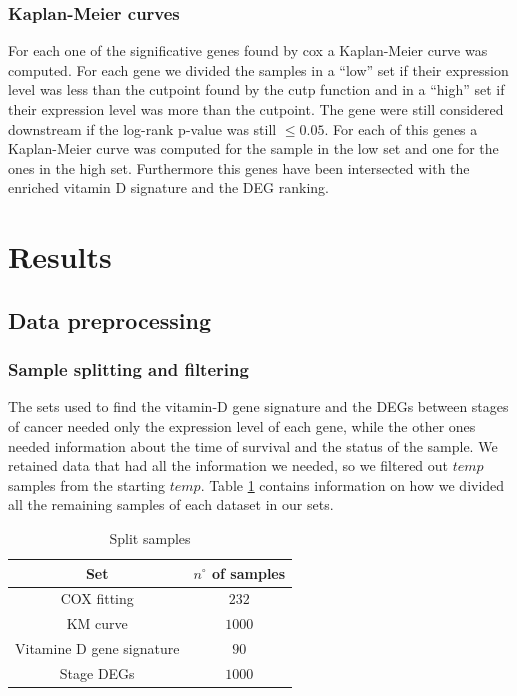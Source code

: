 \documentclass[fleqn,10pt]{SelfArx} %
\begin{document}
		\subsubsection{Kaplan-Meier curves}
			For each one of the significative genes found by cox a Kaplan-Meier curve \cite{survfit} was computed.
			For each gene we divided the samples in a ``low'' set if their expression level was less than the cutpoint found by the cutp function and in a ``high'' set if their expression level was more than the cutpoint.
			The gene were still considered downstream if the log-rank p-value was still $\le0.05$.
			For each of this genes a Kaplan-Meier curve was computed for the sample in the low set and one for the ones in the high set.
			Furthermore this genes have been intersected with the enriched vitamin D signature and the DEG ranking.


\section{Results}

	\subsection{Data preprocessing}

		\subsubsection{Sample splitting and filtering}
		The sets used to find the vitamin-D gene signature and the DEGs between stages of cancer needed only the expression level of each gene, while the other ones needed information about the time of survival and the status of the sample.
		We retained data that had all the information we needed, so we filtered out $temp$ samples from the starting $temp$.
		Table \ref{tab:samples_split} contains information on how we divided all the remaining samples of each dataset in our sets.

		\begin{table}[H]
			\centering
			\begin{tabular}{cc}
				\hline
				Set & $n^\circ$ of samples\\
				\hline
				COX fitting & $232$\\
				KM curve & $1000$\\
				Vitamine D gene signature & $90$\\
				Stage DEGs & $1000$\\
				\hline
			\end{tabular}
			\caption{Split samples}
			\label{tab:samples_split}
		\end{table}
\end{document}
